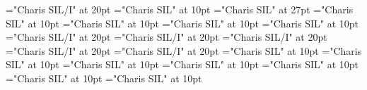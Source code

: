\documentclass[a4paper]{article}
\begin{document}
\pagestyle{plain}
\sloppy
\setlength{\parfillskip}{0pt plus 1fil}
\font\pronunciationenUKpronunciationbefore="Charis SIL/I" at 20pt
\font\sectionletterdictionary="Charis SIL" at 10pt
\font\headsectionletterdictionary="Charis SIL" at 27pt
\font\articledictionary="Charis SIL" at 10pt
\font\firstoftypeheadwordlastoftypearticledictionary="Charis SIL" at 10pt
\font\firstoftypegrammarrequireslastoftypearticledictionary="Charis SIL" at 10pt
\font\firstoftypelastoftyperelationsynonymarticledictionary="Charis SIL" at 10pt
\font\firstoftypepronunciationenUKarticledictionary="Charis SIL/I" at 20pt
\font\pronunciationenUKpronunciationbeforearticledictionary="Charis SIL/I" at 20pt
\font\lastoftypepronunciationenUSarticledictionary="Charis SIL/I" at 20pt
\font\pronunciationpronunciationbeforearticledictionary="Charis SIL/I" at 20pt
\font\lastoftypepronunciationenUKarticledictionary="Charis SIL/I" at 20pt
\font\firstoftypegrammarcategorylastoftypearticledictionary="Charis SIL" at 10pt
\font{}="Charis SIL" at 10pt
\font\firstoftypelastoftypenotearticledictionary="Charis SIL" at 10pt
\font\exampleusefirstoftypearticledictionary="Charis SIL" at 10pt
\font\examplefirstoftypearticledictionary="Charis SIL" at 10pt
\font\exampleuselastoftypearticledictionary="Charis SIL" at 10pt
\font\examplelastoftypearticledictionary="Charis SIL" at 10pt

\pagestyle{fancy} 
\begin{center}
\end{center}

\pronunciationpronunciationbeforearticledictionary{, }
\end{document}
